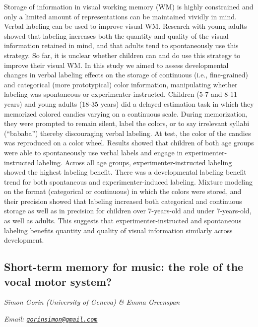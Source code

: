 \documentclass[
  12pt,
]{book}
\begin{document}
Storage of information in visual working memory (WM) is highly constrained and only a limited amount of representations can be maintained vividly in mind. Verbal labeling can be used to improve visual WM. Research with young adults showed that labeling increases both the quantity and quality of the visual information retained in mind, and that adults tend to spontaneously use this strategy. So far, it is unclear whether children can and do use this strategy to improve their visual WM. In this study we aimed to assess developmental changes in verbal labeling effects on the storage of continuous (i.e., fine-grained) and categorical (more prototypical) color information, manipulating whether labeling was spontaneous or experimenter-instructed. Children (5-7 and 8-11 years) and young adults (18-35 years) did a delayed estimation task in which they memorized colored candies varying on a continuous scale. During memorization, they were prompted to remain silent, label the colors, or to say irrelevant syllabi (``bababa'') thereby discouraging verbal labeling. At test, the color of the candies was reproduced on a color wheel. Results showed that children of both age groups were able to spontaneously use verbal labels and engage in experimenter-instructed labeling. Across all age groups, experimenter-instructed labeling showed the highest labeling benefit. There was a developmental labeling benefit trend for both spontaneous and experimenter-induced labeling. Mixture modeling on the format (categorical or continuous) in which the colors were stored, and their precision showed that labeling increased both categorical and continuous storage as well as in precision for children over 7-years-old and under 7-years-old, as well as adults. This suggests that experimenter-instructed and spontaneous labeling benefits quantity and quality of visual information similarly across development.

\hypertarget{short-term-memory-for-music-the-role-of-the-vocal-motor-system}{%
\subsection{Short-term memory for music: the role of the vocal motor system?}\label{short-term-memory-for-music-the-role-of-the-vocal-motor-system}}

\emph{Simon Gorin (University of Geneva) \& Emma Greenspan}

\emph{Email: \href{mailto:gorinsimon@gmail.com}{\nolinkurl{gorinsimon@gmail.com}}}
\end{document}
